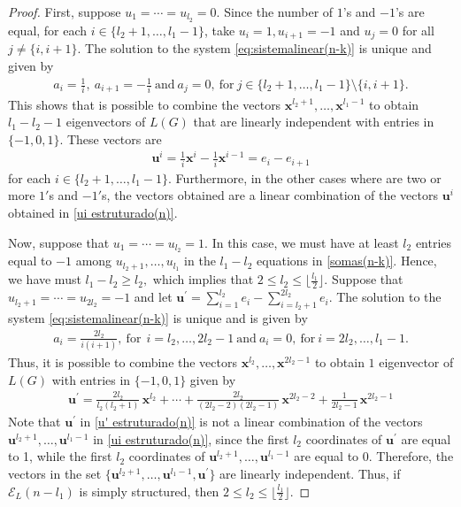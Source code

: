\documentclass[preprint]{elsarticle}
\begin{document}
\begin{proof}
First, suppose $u_1 = \cdots =u_{l_2} = 0.$ Since the number of $1$'s and $-1$'s are equal, for each $i \in \{l_2+1,\ldots,l_1-1\}$, take $u_{i} = 1, u_{i+1} = -1$ and $u_{j} = 0$ for all $j \ne \{i, i+1\}.$ The solution to the system \eqref{eq:sistemalinear(n-k)} is unique and given by 
\begin{align*}
    a_{i}=\frac{1}{i}, \ a_{i+1} = -\frac{1}{i} \ \text{and} \ a_{j}=0, \ \text{for} \  j \in \{l_2+1, \ldots, l_1-1\} \setminus \{i, i+1\}.    
\end{align*}
This shows that is possible to combine the vectors  $\mathbf{x}^{l_2+1},\ldots,\mathbf{x}^{l_1-1}$ to obtain $l_1-l_2-1$ eigenvectors of $L(G)$ that are linearly independent with entries in $\{-1,0,1\}$. These vectors are 
\begin{align}\label{ui estruturado(n)}
    \mathbf{u}^{i} = \frac{1}{i}\mathbf{x}^i-\frac{1}{i}\mathbf{x}^{i-1} = e_i-e_{i+1}
\end{align}
for each $i \in \{l_2+1,\ldots,l_1-1\}.$
Furthermore, in the other cases where are two or more $1'$s and $-1'$s, the vectors obtained are a linear combination of the vectors $\mathbf{u}^{i}$ obtained in \eqref{ui estruturado(n)}.

Now, suppose that $u_{1} = \cdots = u_{l_2} =1.$ In this case, we must have at least $l_2$ entries equal to $-1$ among $u_{l_2+1},\ldots,u_{l_1}$ in the $l_1-l_2$ equations in \eqref{somas(n-k)}. Hence, we have must $l_1 -l_2 \geq l_2,$ which implies that $2\leq l_2 \leq \lfloor \frac{l_1}{2} \rfloor.$ Suppose that $u_{l_2+1} = \cdots = u_{2l_2} =-1$ and let $\mathbf{u}^{\prime}=\sum_{i=1}^{l_2} e_i-\sum_{i=l_2+1}^{2l_2} e_{i}$. The solution to the system \eqref{eq:sistemalinear(n-k)} is unique and is given by 
\begin{align*}
    a_i=\frac{2l_2}{i(i+1)}, \ \text{for} \ \  i=l_2, \ldots, 2l_2-1 \ \text{and} \ a_i=0, \ \text{for} \ i=2l_2, \ldots, l_1-1.
\end{align*}
Thus, it is possible to combine the vectors $\mathbf{x}^{l_2},\ldots,\mathbf{x}^{2l_2-1}$ to obtain $1$ eigenvector of $L(G)$ with entries in $\{-1,0,1\}$ given by
\begin{align}\label{u' estruturado(n)}
    \mathbf{u}^{\prime}=\frac{2l_2}{l_2(l_2+1)} \, \mathbf{x}^{l_2} + \cdots + \frac{2l_2}{(2l_2-2)(2l_2-1)} \, \mathbf{x}^{2l_2-2} + \frac{1}{2l_2-1} \, \mathbf{x}^{2l_2-1}
\end{align}
Note that $\mathbf{u}^{\prime}$ in \eqref{u' estruturado(n)} is not a linear combination of the vectors  $\mathbf{u}^{l_2+1}, \ldots, \mathbf{u}^{l_1-1}$ in \eqref{ui estruturado(n)}, since the first $l_2$ coordinates of $\mathbf{u}^{\prime}$ are equal to 1, while the first $l_2$ coordinates of $\mathbf{u}^{l_2+1}, \ldots, \mathbf{u}^{l_1-1}$ are equal to 0. Therefore, the vectors in the set $\{\mathbf{u}^{l_2+1},\ldots,\mathbf{u}^{l_1-1}, \mathbf{u}^{\prime}\}$ are linearly independent. Thus, if $\mathcal{E}_L(n-l_1)$ is simply structured, then $2\leq l_2 \leq \lfloor \frac{l_1}{2} \rfloor.$


\end{proof}
\end{document}
